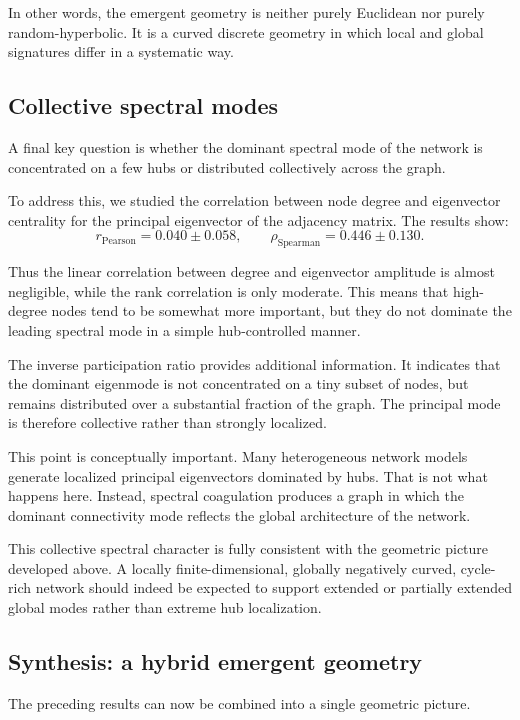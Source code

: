 \documentclass[11pt]{article}
\begin{document}
In other words, the emergent geometry is neither purely Euclidean nor purely random-hyperbolic.
It is a curved discrete geometry in which local and global signatures differ in a systematic way.

\subsection{Collective spectral modes}
\label{sec:collective_modes}

A final key question is whether the dominant spectral mode of the network is concentrated on a few hubs or distributed collectively across the graph.

To address this, we studied the correlation between node degree and eigenvector centrality for the principal eigenvector of the adjacency matrix.
The results show:
\[
r_{\mathrm{Pearson}} = 0.040 \pm 0.058,
\qquad
\rho_{\mathrm{Spearman}} = 0.446 \pm 0.130.
\]

Thus the linear correlation between degree and eigenvector amplitude is almost negligible, while the rank correlation is only moderate.
This means that high-degree nodes tend to be somewhat more important, but they do not dominate the leading spectral mode in a simple hub-controlled manner.

The inverse participation ratio provides additional information.
It indicates that the dominant eigenmode is not concentrated on a tiny subset of nodes, but remains distributed over a substantial fraction of the graph.
The principal mode is therefore collective rather than strongly localized.

This point is conceptually important.
Many heterogeneous network models generate localized principal eigenvectors dominated by hubs.
That is not what happens here.
Instead, spectral coagulation produces a graph in which the dominant connectivity mode reflects the global architecture of the network.

This collective spectral character is fully consistent with the geometric picture developed above.
A locally finite-dimensional, globally negatively curved, cycle-rich network should indeed be expected to support extended or partially extended global modes rather than extreme hub localization.

\subsection{Synthesis: a hybrid emergent geometry}

The preceding results can now be combined into a single geometric picture.
\end{document}
